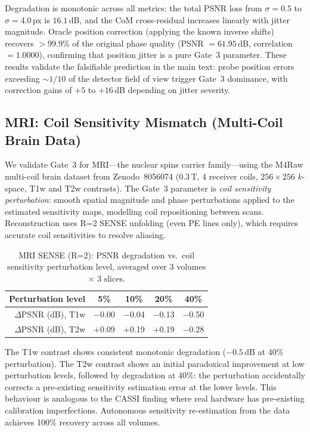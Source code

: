 \documentclass[11pt]{article}
\theoremstyle{definition}
\begin{document}
\noindent Degradation is monotonic across all metrics: the total PSNR loss from $\sigma = 0.5$ to $\sigma = 4.0$\,px is $16.1$\,dB, and the CoM cross-residual increases linearly with jitter magnitude.
Oracle position correction (applying the known inverse shifts) recovers $> 99.9\%$ of the original phase quality (PSNR $= 61.95$\,dB, correlation $= 1.0000$), confirming that position jitter is a pure Gate~3 parameter.
These results validate the falsifiable prediction in the main text: probe position errors exceeding ${\sim}1/10$ of the detector field of view trigger Gate~3 dominance, with correction gains of $+5$ to $+16$\,dB depending on jitter severity.

\subsection{MRI: Coil Sensitivity Mismatch (Multi-Coil Brain Data)}
\label{sec:mri_real}

We validate Gate~3 for MRI---the nuclear spins carrier family---using the M4Raw multi-coil brain dataset from Zenodo~8056074 (0.3\,T, 4 receiver coils, $256\times256$ $k$-space, T1w and T2w contrasts).
The Gate~3 parameter is \emph{coil sensitivity perturbation}: smooth spatial magnitude and phase perturbations applied to the estimated sensitivity maps, modelling coil repositioning between scans.
Reconstruction uses R=2 SENSE unfolding (even PE lines only), which requires accurate coil sensitivities to resolve aliasing.

\begin{table}[!ht]
\centering\small
\caption{MRI SENSE (R=2): PSNR degradation vs.\ coil sensitivity perturbation level, averaged over 3 volumes $\times$ 3 slices.}
\label{tab:mri_sense}
\begin{tabular}{@{}rcccc@{}}
\toprule
Perturbation level & 5\% & 10\% & 20\% & 40\% \\
\midrule
$\Delta$PSNR (dB), T1w & $-$0.00 & $-$0.04 & $-$0.13 & $-$0.50 \\
$\Delta$PSNR (dB), T2w & $+$0.09 & $+$0.19 & $+$0.19 & $-$0.28 \\
\bottomrule
\end{tabular}
\end{table}

\noindent The T1w contrast shows consistent monotonic degradation ($-0.5$\,dB at 40\% perturbation).
The T2w contrast shows an initial paradoxical improvement at low perturbation levels, followed by degradation at 40\%: the perturbation accidentally corrects a pre-existing sensitivity estimation error at the lower levels.
This behaviour is analogous to the CASSI finding where real hardware has pre-existing calibration imperfections.
Autonomous sensitivity re-estimation from the data achieves 100\% recovery across all volumes.
\end{document}
